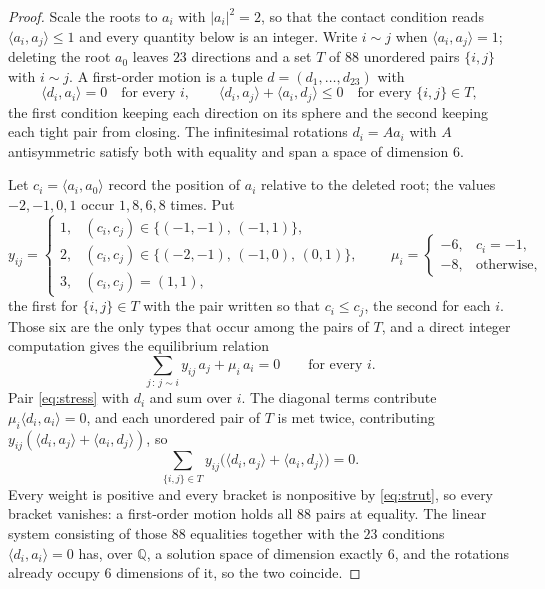 \documentclass[11pt,reqno]{amsart}
\renewcommand{\_}{\origunderscore\allowbreak}
\numberwithin{equation}{section}
\theoremstyle{plain}
\theoremstyle{definition}
\theoremstyle{remark}
\begin{document}
\begin{proof}
Scale the roots to $a_i$ with $|a_i|^2=2$, so that the contact condition
reads $\langle a_i,a_j\rangle\le1$ and every quantity below is an
integer. Write $i\sim j$ when $\langle a_i,a_j\rangle=1$; deleting the
root $a_0$ leaves $23$ directions and a set $T$ of $88$ unordered pairs
$\{i,j\}$ with $i\sim j$. A first-order motion is a tuple
$d=(d_1,\dots,d_{23})$ with
\begin{equation}\label{eq:strut}
  \langle d_i,a_i\rangle=0\quad\text{for every }i,
  \qquad
  \langle d_i,a_j\rangle+\langle a_i,d_j\rangle\le0
  \quad\text{for every }\{i,j\}\in T,
\end{equation}
the first condition keeping each direction on its sphere and the second
keeping each tight pair from closing. The infinitesimal rotations
$d_i=Aa_i$ with $A$ antisymmetric satisfy both with equality and span a
space of dimension $6$.

Let $c_i=\langle a_i,a_0\rangle$ record the position of $a_i$ relative
to the deleted root; the values $-2,-1,0,1$ occur $1,8,6,8$ times. Put
\[
  y_{ij}=\begin{cases}
    1,&(c_i,c_j)\in\bigl\{(-1,-1),\,(-1,1)\bigr\},\\
    2,&(c_i,c_j)\in\bigl\{(-2,-1),\,(-1,0),\,(0,1)\bigr\},\\
    3,&(c_i,c_j)=(1,1),
  \end{cases}
  \qquad
  \mu_i=\begin{cases}-6,&c_i=-1,\\-8,&\text{otherwise},\end{cases}
\]
the first for $\{i,j\}\in T$ with the pair written so that $c_i\le c_j$,
the second for each $i$. Those six are the only types that occur among
the pairs of $T$, and a direct integer computation gives the equilibrium
relation
\begin{equation}\label{eq:stress}
  \sum_{j\,:\,j\sim i} y_{ij}\,a_j+\mu_i\,a_i=0
  \qquad\text{for every }i .
\end{equation}
Pair \eqref{eq:stress} with $d_i$ and sum over $i$. The diagonal terms
contribute $\mu_i\langle d_i,a_i\rangle=0$, and each unordered pair of
$T$ is met twice, contributing
$y_{ij}(\langle d_i,a_j\rangle+\langle a_i,d_j\rangle)$, so
\[
  \sum_{\{i,j\}\in T} y_{ij}
  \bigl(\langle d_i,a_j\rangle+\langle a_i,d_j\rangle\bigr)=0 .
\]
Every weight is positive and every bracket is nonpositive by
\eqref{eq:strut}, so every bracket vanishes: a first-order motion holds
all $88$ pairs at equality. The linear system consisting of those $88$
equalities together with the $23$ conditions
$\langle d_i,a_i\rangle=0$ has, over $\mathbb{Q}$, a solution space of
dimension exactly $6$, and the rotations already occupy $6$ dimensions
of it, so the two coincide.
\end{proof}
\end{document}

